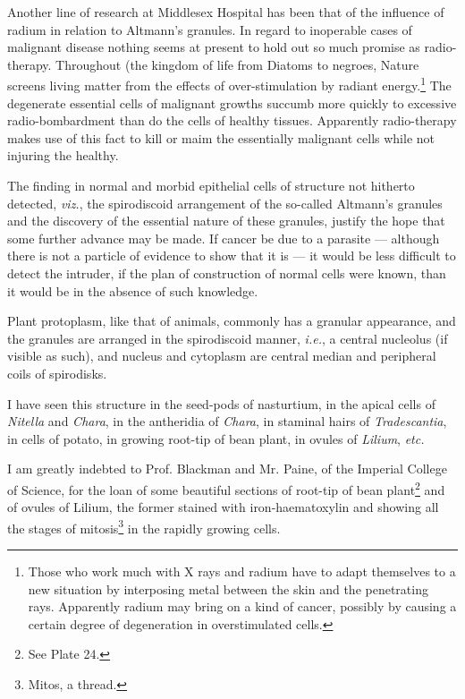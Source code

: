 \documentclass[a4paper, 12pt, oneside]{article}
\begin{document}
Another line of research at Middlesex Hospital has been that of the influence of radium in relation to Altmann's granules. In regard to inoperable cases of malignant disease nothing seems at present to hold out so much promise as radio-therapy. Throughout (the kingdom of life from Diatoms to negroes, Nature screens living matter from the effects of over-stimulation by radiant energy.\footnote{Those who work much with X rays and radium have to adapt themselves to a new situation by interposing metal between the skin and the penetrating rays. Apparently radium may bring on a kind of cancer, possibly by causing a certain degree of degeneration in overstimulated cells.} The degenerate essential cells of malignant growths succumb more quickly to excessive radio-bombardment than do the cells of healthy tissues. Apparently radio-therapy makes use of this fact to kill or maim the essentially malignant cells while not injuring the healthy.

The finding in normal and morbid epithelial cells of structure not hitherto detected, \emph{viz.}, the spirodiscoid arrangement of the so-called Altmann's granules and the discovery of the essential nature of these granules, justify the hope that some further advance may be made. If cancer be due to a parasite --- although there is not a particle of evidence to show that it is --- it would be less difficult to detect the intruder, if the plan of construction of normal cells were known, than it would be in the absence of such knowledge.

Plant protoplasm, like that of animals, commonly has a granular appearance, and the granules are arranged in the spirodiscoid manner, \emph{i.e.}, a central nucleolus (if visible as such), and nucleus and cytoplasm are central median and peripheral coils of spirodisks.

I have seen this structure in the seed-pods of nasturtium, in the apical cells of \emph{Nitella} and \emph{Chara}, in the antheridia of \emph{Chara}, in staminal hairs of \emph{Tradescantia}, in cells of potato, in growing root-tip of bean plant, in ovules of \emph{Lilium}, \emph{etc.}

I am greatly indebted to Prof. Blackman and Mr. Paine, of the Imperial College of Science, for the loan of some beautiful sections of root-tip of bean plant\footnote{See Plate 24.} and of ovules of Lilium, the former stained with iron-haematoxylin and showing all the stages of mitosis\footnote{Mitos, a thread.} in the rapidly growing cells.
\end{document}
